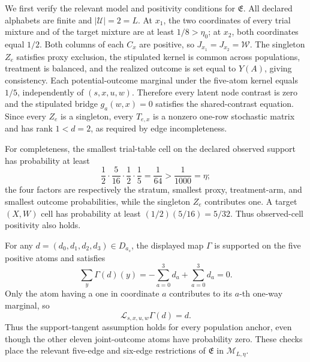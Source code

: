 We first verify the relevant model and positivity conditions for \(\mathfrak E\).  All declared alphabets are finite and \(|\mathcal U|=2=L\).  At \(x_1\), the two coordinates of every trial mixture and of the target mixture are at least \(1/8>\eta_0\); at \(x_2\), both coordinates equal \(1/2\).  Both columns of each \(C_x\) are positive, so \(J_{x_1}=J_{x_2}=\mathcal W\).  The singleton \(Z_e\) satisfies proxy exclusion, the stipulated kernel is common across populations, treatment is balanced, and the realized outcome is set equal to \(Y(A)\), giving consistency.  Each potential-outcome marginal under the five-atom kernel equals \(1/5\), independently of \((s,x,u,w)\).  Therefore every latent node contrast is zero and the stipulated bridge \(g_a(w,x)=0\) satisfies the shared-contrast equation.  Since every \(Z_e\) is a singleton, every \(T_{e,x}\) is a nonzero one-row stochastic matrix and has rank \(1<d=2\), as required by edge incompleteness.

For completeness, the smallest trial-table cell on the declared observed support has probability at least
\[
\frac12\cdot\frac5{16}\cdot\frac12\cdot\frac15=\frac1{64}>\frac1{1000}=\eta;
\]
the four factors are respectively the stratum, smallest proxy, treatment-arm, and smallest outcome probabilities, while the singleton \(Z_e\) contributes one.  A target \((X,W)\) cell has probability at least \((1/2)(5/16)=5/32\).  Thus observed-cell positivity also holds.

For any \(d=(d_0,d_1,d_2,d_3)\in D_{a_s}\), the displayed map \(\Gamma\) is supported on the five positive atoms and satisfies
\[
\sum_y\Gamma(d)(y)
=-\sum_{a=0}^3d_a+\sum_{a=0}^3d_a=0.
\]
Only the atom having a one in coordinate \(a\) contributes to its \(a\)-th one-way marginal, so
\[
\mathscr L_{s,x,u,w}\Gamma(d)=d.
\]
Thus the support-tangent assumption holds for every population anchor, even though the other eleven joint-outcome atoms have probability zero.  These checks place the relevant five-edge and six-edge restrictions of \(\mathfrak E\) in \(\mathcal M_{L,\eta}\).

